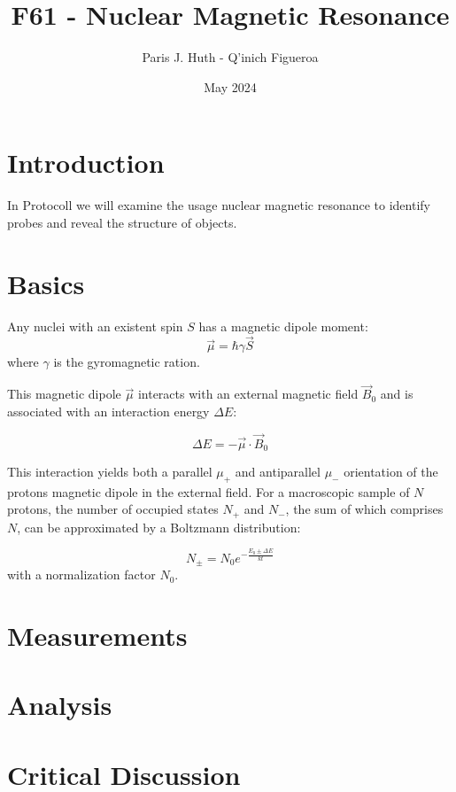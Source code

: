 \documentclass{article}
\title{F61 - Nuclear Magnetic Resonance}
\author{Paris J. Huth - Q'inich Figueroa}
\date{May 2024}
\begin{document}
\maketitle

\section{Introduction}
In Protocoll we will examine the usage nuclear magnetic resonance to identify probes and reveal the structure of objects.
\section{Basics}

Any nuclei with an existent spin $S$ has a magnetic dipole moment: 
$$ \vec{\mu} = \hbar \gamma \vec{S}$$
where $\gamma$ is the gyromagnetic ration. 

This magnetic dipole $\vec{\mu}$ interacts with an external magnetic field $\vec{B}_0$ and is associated with an interaction energy $\Delta E$:

$$\Delta E = -\vec{\mu}\cdot \vec{B}_0$$

This interaction yields both a parallel $\mu_+$ and antiparallel $\mu_-$ orientation of the protons magnetic dipole in the external field. 
For a macroscopic sample of $N$ protons, the number of occupied states $N_+$ and $N_-$, the sum of which comprises $N$, can be approximated by a Boltzmann distribution:

$$ N_\pm = N_0e^{-\frac{E_0\pm\Delta E}{kt}}$$
with a normalization factor $N_0$.

\section{Measurements}
\section{Analysis}
\section{Critical Discussion}
\end{document}
